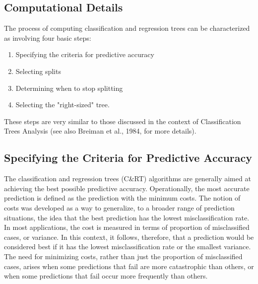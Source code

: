 \documentclass[caret-main.tex]{subfiles}
\begin{document}
\subsection{Computational Details}

The process of computing classification and regression trees can be characterized as involving four basic steps:

\begin{enumerate}
\item Specifying the criteria for predictive accuracy
\item Selecting splits
\item Determining when to stop splitting
\item Selecting the "right-sized" tree.
\end{enumerate}
These steps are very similar to those discussed in the context of Classification Trees Analysis (see also Breiman et al., 1984, for more details).

\newpage 

\subsection{Specifying the Criteria for Predictive Accuracy}

The classification and regression trees (C\&RT) algorithms are generally aimed at achieving the best possible predictive accuracy. Operationally, the most accurate prediction is defined as the prediction with the minimum costs. The notion of costs was developed as a way to generalize, to a broader range of prediction situations, the idea that the best prediction has the lowest misclassification rate. In most applications, the cost is measured in terms of proportion of misclassified cases, or variance. In this context, it follows, therefore, that a prediction would be considered best if it has the lowest misclassification rate or the smallest variance. The need for minimizing costs, rather than just the proportion of misclassified cases, arises when some predictions that fail are more catastrophic than others, or when some predictions that fail occur more frequently than others.
\end{document}
